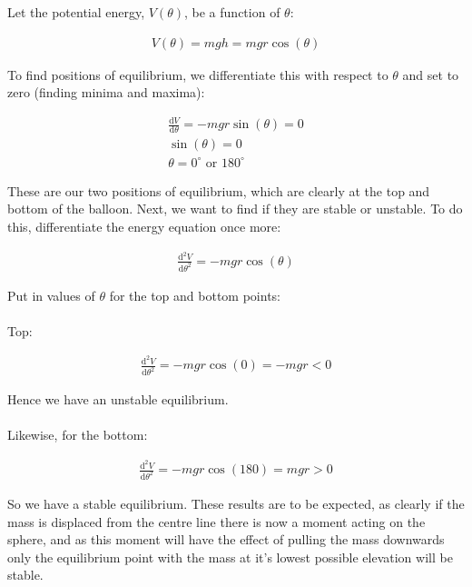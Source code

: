 \begin{problem}
{Let the potential energy, $V(\theta)$, be a function of $\theta$:

\begin{align*} V(\theta) = mgh = mgr\cos(\theta)\end{align*}

To find positions of equilibrium, we differentiate this with respect to $\theta$ and set to zero (finding minima and maxima):

\begin{align*} \frac{\textrm{d}V}{\textrm{d}\theta} = -mgr\sin(\theta) = 0 \\
\sin(\theta) = 0 \\
\theta = 0^{\circ} \textrm{ or } 180^{\circ} \end{align*}

These are our two positions of equilibrium, which are clearly at the top and bottom of the balloon. Next, we want to find if they are stable or unstable. To do this, differentiate the energy equation once more:

\begin{align*} \frac{\textrm{d}^{2}V}{\textrm{d}{\theta}^2} = -mgr\cos(\theta) \end{align*}

Put in values of $\theta$ for the top and bottom points:\\
\\ Top:

\begin{align*} \frac{\textrm{d}^{2}V}{\textrm{d}{\theta}^2} = -mgr\cos(0) = -mgr < 0 \end{align*}

Hence we have an unstable equilibrium. \\
\\Likewise, for the bottom:

\begin{align*} \frac{\textrm{d}^{2}V}{\textrm{d}{\theta}^2} = -mgr\cos(180) = mgr > 0 \end{align*}

So we have a stable equilibrium. These results are to be expected, as clearly if the mass is displaced from the centre line there is now a moment acting on the sphere, and as this moment will have the effect of pulling the mass downwards only the equilibrium point with the mass at it's lowest possible elevation will be stable.

}
\end{problem}